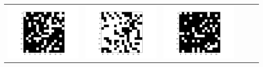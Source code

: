 \documentclass[12pt]{report}
\begin{document}
\begin{table}[H]
\begin{tabular}{  c  c  c  c  c  c }
\begin{minipage}{.15\textwidth}
      \includegraphics[scale=0.2]{BM_chidden.png}
    \end{minipage} &
    \begin{minipage}{.15\textwidth}
      \includegraphics[scale=0.2]{BM_dhidden.png}
    \end{minipage}&
    \begin{minipage}{.15\textwidth}
      \includegraphics[scale=0.2]{BM_ehidden.png}

\end{minipage}
\end{tabular}
\end{table}
\end{document}
